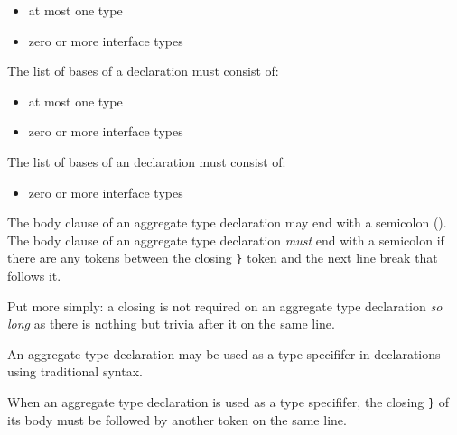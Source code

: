 \begin{itemize}
\item at most one  type
\item zero or more interface types
\end{itemize}


The list of bases of a  declaration must consist of:

\begin{itemize}
\item at most one  type
\item zero or more interface types
\end{itemize}

The list of bases of an  declaration must consist of:

\begin{itemize}
\item zero or more interface types
\end{itemize}

\begin{Legacy}

The body clause of an aggregate type declaration may end with a semicolon (\code{;}).
The body clause of an aggregate type declaration \emph{must} end with a semicolon if there are any tokens between the closing \lstinline|}| token and the next line break that follows it.

\begin{Note}
Put more simply: a closing \code{;} is not required on an aggregate type declaration \emph{so long} as there is nothing but trivia after it on the same line.
\end{Note}

\end{Legacy}

\begin{Legacy}

An aggregate type declaration may be used as a type specififer in declarations using traditional syntax.

When an aggregate type declaration is used as a type specififer, the closing \lstinline|}| of its body must be followed by another token on the same line.

\end{Legacy}


\begin{Syntax}
     \\
          \\
        \SynOpt \\
        \SynOpt
        \SynOpt \\
         \code{;}\SynOpt\\

     \\
         \\
        \SynOr {}
\end{Syntax}

